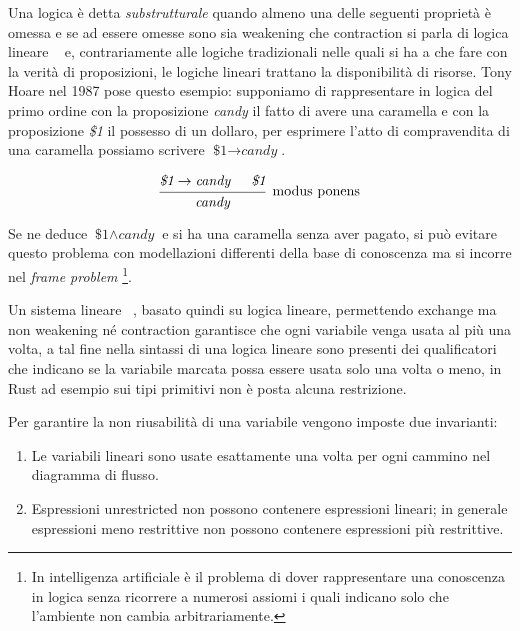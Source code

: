 \documentclass[Lau,binding=0.6cm]{sapthesis}
\begin{document}
Una logica è detta \textit{substrutturale} quando almeno una delle seguenti proprietà è omessa e se ad essere omesse sono sia weakening che contraction si parla di logica lineare ~\cite{girard:linear_logic} e, contrariamente alle logiche tradizionali nelle quali si ha a che fare con la verità di proposizioni, le logiche lineari trattano la disponibilità di risorse. Tony Hoare nel 1987 pose questo esempio: supponiamo di rappresentare in logica del primo ordine con la proposizione \textit{candy} il fatto di avere una caramella e con la proposizione \textit{\$1} il possesso di un dollaro, per esprimere l'atto di compravendita di una caramella possiamo scrivere $ \textit{\$1} \rightarrow \textit{candy} $.

\begin{equation*}
  \begin{prooftree}
    \hypo{\textit{\$1} \rightarrow \textit{candy}}
    \hypo{\textit{\$1}}
    \infer2[modus ponens]{\textit{candy}}
  \end{prooftree}
\end{equation*}

Se ne deduce $ \textit{\$1} \land \textit{candy} $ e si ha una caramella senza aver pagato, si può evitare questo problema con modellazioni differenti della base di conoscenza ma si incorre nel \textit{frame problem} \footnote{In intelligenza artificiale è il problema di dover rappresentare una conoscenza in logica senza ricorrere a numerosi assiomi i quali indicano solo che l'ambiente non cambia arbitrariamente.}. 

Un sistema lineare ~\cite{walker:linear_logic}, basato quindi su logica lineare, permettendo exchange ma non weakening né contraction garantisce che ogni variabile venga usata al più una volta, a tal fine nella sintassi di una logica lineare sono presenti dei qualificatori che indicano se la variabile marcata possa essere usata solo una volta o meno, in Rust ad esempio sui tipi primitivi non è posta alcuna restrizione. 

Per garantire la non riusabilità di una variabile vengono imposte due invarianti:

\begin{enumerate}
    \item Le variabili lineari sono usate esattamente una volta per ogni cammino nel diagramma di flusso.
    \item Espressioni unrestricted non possono contenere espressioni lineari; in generale espressioni meno restrittive non possono contenere espressioni più restrittive. 
\end{enumerate}
\end{document}
